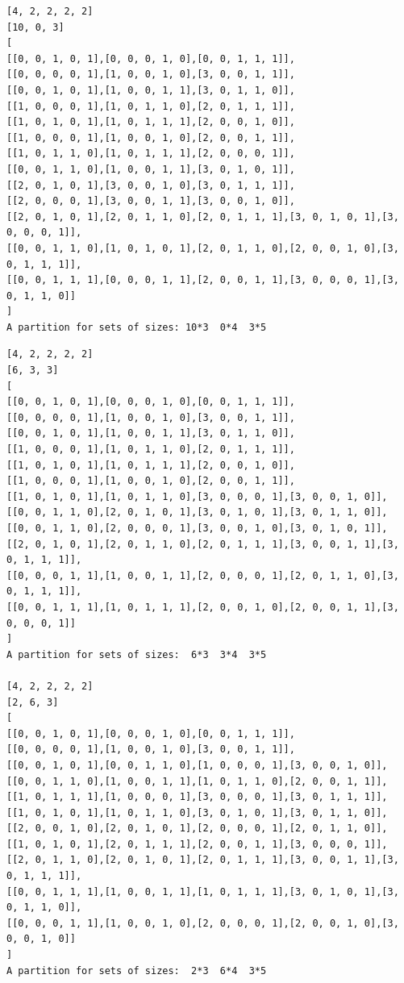 \documentclass[final]{dmtcs-episciences}
\begin{document}
\begin{appendices}
\begin{verbatim}
[4, 2, 2, 2, 2]
[10, 0, 3]
[
[[0, 0, 1, 0, 1],[0, 0, 0, 1, 0],[0, 0, 1, 1, 1]],
[[0, 0, 0, 0, 1],[1, 0, 0, 1, 0],[3, 0, 0, 1, 1]],
[[0, 0, 1, 0, 1],[1, 0, 0, 1, 1],[3, 0, 1, 1, 0]],
[[1, 0, 0, 0, 1],[1, 0, 1, 1, 0],[2, 0, 1, 1, 1]],
[[1, 0, 1, 0, 1],[1, 0, 1, 1, 1],[2, 0, 0, 1, 0]],
[[1, 0, 0, 0, 1],[1, 0, 0, 1, 0],[2, 0, 0, 1, 1]],
[[1, 0, 1, 1, 0],[1, 0, 1, 1, 1],[2, 0, 0, 0, 1]],
[[0, 0, 1, 1, 0],[1, 0, 0, 1, 1],[3, 0, 1, 0, 1]],
[[2, 0, 1, 0, 1],[3, 0, 0, 1, 0],[3, 0, 1, 1, 1]],
[[2, 0, 0, 0, 1],[3, 0, 0, 1, 1],[3, 0, 0, 1, 0]],
[[2, 0, 1, 0, 1],[2, 0, 1, 1, 0],[2, 0, 1, 1, 1],[3, 0, 1, 0, 1],[3, 0, 0, 0, 1]],
[[0, 0, 1, 1, 0],[1, 0, 1, 0, 1],[2, 0, 1, 1, 0],[2, 0, 0, 1, 0],[3, 0, 1, 1, 1]],
[[0, 0, 1, 1, 1],[0, 0, 0, 1, 1],[2, 0, 0, 1, 1],[3, 0, 0, 0, 1],[3, 0, 1, 1, 0]]
]
A partition for sets of sizes: 10*3  0*4  3*5
\end{verbatim}

\newpage

\begin{verbatim} 
[4, 2, 2, 2, 2]
[6, 3, 3]
[
[[0, 0, 1, 0, 1],[0, 0, 0, 1, 0],[0, 0, 1, 1, 1]],
[[0, 0, 0, 0, 1],[1, 0, 0, 1, 0],[3, 0, 0, 1, 1]],
[[0, 0, 1, 0, 1],[1, 0, 0, 1, 1],[3, 0, 1, 1, 0]],
[[1, 0, 0, 0, 1],[1, 0, 1, 1, 0],[2, 0, 1, 1, 1]],
[[1, 0, 1, 0, 1],[1, 0, 1, 1, 1],[2, 0, 0, 1, 0]],
[[1, 0, 0, 0, 1],[1, 0, 0, 1, 0],[2, 0, 0, 1, 1]],
[[1, 0, 1, 0, 1],[1, 0, 1, 1, 0],[3, 0, 0, 0, 1],[3, 0, 0, 1, 0]],
[[0, 0, 1, 1, 0],[2, 0, 1, 0, 1],[3, 0, 1, 0, 1],[3, 0, 1, 1, 0]],
[[0, 0, 1, 1, 0],[2, 0, 0, 0, 1],[3, 0, 0, 1, 0],[3, 0, 1, 0, 1]],
[[2, 0, 1, 0, 1],[2, 0, 1, 1, 0],[2, 0, 1, 1, 1],[3, 0, 0, 1, 1],[3, 0, 1, 1, 1]],
[[0, 0, 0, 1, 1],[1, 0, 0, 1, 1],[2, 0, 0, 0, 1],[2, 0, 1, 1, 0],[3, 0, 1, 1, 1]],
[[0, 0, 1, 1, 1],[1, 0, 1, 1, 1],[2, 0, 0, 1, 0],[2, 0, 0, 1, 1],[3, 0, 0, 0, 1]]
]
A partition for sets of sizes:  6*3  3*4  3*5

[4, 2, 2, 2, 2]
[2, 6, 3]
[
[[0, 0, 1, 0, 1],[0, 0, 0, 1, 0],[0, 0, 1, 1, 1]],
[[0, 0, 0, 0, 1],[1, 0, 0, 1, 0],[3, 0, 0, 1, 1]],
[[0, 0, 1, 0, 1],[0, 0, 1, 1, 0],[1, 0, 0, 0, 1],[3, 0, 0, 1, 0]],
[[0, 0, 1, 1, 0],[1, 0, 0, 1, 1],[1, 0, 1, 1, 0],[2, 0, 0, 1, 1]],
[[1, 0, 1, 1, 1],[1, 0, 0, 0, 1],[3, 0, 0, 0, 1],[3, 0, 1, 1, 1]],
[[1, 0, 1, 0, 1],[1, 0, 1, 1, 0],[3, 0, 1, 0, 1],[3, 0, 1, 1, 0]],
[[2, 0, 0, 1, 0],[2, 0, 1, 0, 1],[2, 0, 0, 0, 1],[2, 0, 1, 1, 0]],
[[1, 0, 1, 0, 1],[2, 0, 1, 1, 1],[2, 0, 0, 1, 1],[3, 0, 0, 0, 1]],
[[2, 0, 1, 1, 0],[2, 0, 1, 0, 1],[2, 0, 1, 1, 1],[3, 0, 0, 1, 1],[3, 0, 1, 1, 1]],
[[0, 0, 1, 1, 1],[1, 0, 0, 1, 1],[1, 0, 1, 1, 1],[3, 0, 1, 0, 1],[3, 0, 1, 1, 0]],
[[0, 0, 0, 1, 1],[1, 0, 0, 1, 0],[2, 0, 0, 0, 1],[2, 0, 0, 1, 0],[3, 0, 0, 1, 0]]
]
A partition for sets of sizes:  2*3  6*4  3*5


\end{verbatim}
\end{appendices}
\end{document}
